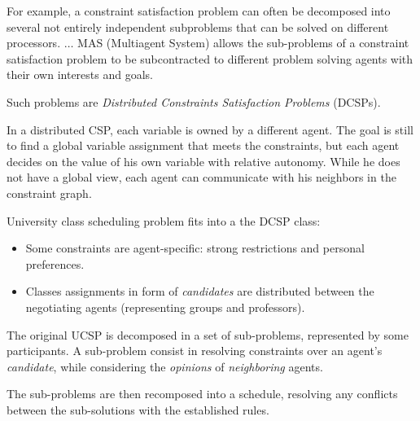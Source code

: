 \documentclass[ThesisDoc]{subfiles}
\begin{document}
\begin{displayquote} %
  For example, a constraint satisfaction problem can often be
  decomposed into several not entirely independent
  subproblems that can be solved on different processors. $\dots$
  MAS (Multiagent System) allows the sub-problems of a constraint satisfaction
  problem to be subcontracted to different problem solving agents with their own
  interests and goals.
\end{displayquote}

\noindent
Such problems are \emph{Distributed Constraints Satisfaction Problems} (DCSPs).
\begin{displayquote} %
  In a distributed CSP, each variable is owned by a different agent. The goal is
  still to find a global variable assignment that meets the constraints, but each agent
  decides on the value of his own variable with relative autonomy. While he does
  not have a global view, each agent can communicate with his neighbors in the
  constraint graph.
\end{displayquote}


University class scheduling problem fits into a the DCSP class:
\begin{itemize}
  \item Some constraints are agent-specific: strong restrictions and
        personal preferences.
  \item Classes assignments in form of \emph{candidates} are distributed between
        the negotiating agents (representing groups and professors).
\end{itemize}

The original UCSP is decomposed in a set of sub-problems, represented by some
participants. A sub-problem consist in resolving constraints over an agent's
\emph{candidate}, while considering the \emph{opinions} of \emph{neighboring}
agents.

The sub-problems are then recomposed into a schedule, resolving any conflicts
between the sub-solutions with the established rules.
\end{document}
